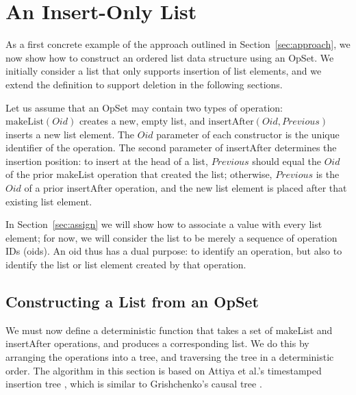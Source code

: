 \section{An Insert-Only List}\label{sec:list}

As a first concrete example of the approach outlined in Section~\ref{sec:approach}, we now show how to construct an ordered list data structure using an OpSet.
We initially consider a list that only supports insertion of list elements, and we extend the definition to support deletion in the following sections.

Let us assume that an OpSet may contain two types of operation:
$\mathrm{makeList}(\mathit{Oid})$ creates a new, empty list, and
$\mathrm{insertAfter}(\mathit{Oid}, \mathit{Previous})$ inserts a new list element.
The $\mathit{Oid}$ parameter of each constructor is the unique identifier of the operation.
The second parameter of insertAfter determines the insertion position: to insert at the head of a list, $\mathit{Previous}$ should equal the $\mathit{Oid}$ of the prior makeList operation that created the list; otherwise, $\mathit{Previous}$ is the $\mathit{Oid}$ of a prior insertAfter operation, and the new list element is placed after that existing list element.

In Section~\ref{sec:assign} we will show how to associate a value with every list element; for now, we will consider the list to be merely a sequence of operation IDs (oids).
An oid thus has a dual purpose: to identify an operation, but also to identify the list or list element created by that operation.

\subsection{Constructing a List from an OpSet}

We must now define a deterministic function that takes a set of makeList and insertAfter operations, and produces a corresponding list.
We do this by arranging the operations into a tree, and traversing the tree in a deterministic order.
The algorithm in this section is based on Attiya et al.'s timestamped insertion tree \cite{Attiya:2016kh}, which is similar to Grishchenko's causal tree \cite{Grishchenko:2014eh}.

